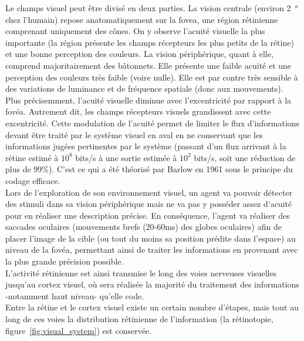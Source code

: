 Le champs visuel peut être divisé en deux parties. La vision centrale (environ \SI{2}{\degree} chez l'humain) repose anatomatiquement sur la fovea, une région rétinienne comprenant uniquement des cônes. On y observe l'acuité visuelle la plus importante (la région présente les champs récepteurs les plus petits de la rétine) et une bonne perception des couleurs.
La vision périphérique, quant à elle, comprend majoritairement des bâtonnets. Elle présente une faible acuité et une perception des couleurs très faible (voire nulle). Elle est par contre très sensible à des variations de luminance et de fréquence spatiale (donc aux mouvements).
 Plus précisemment, l'acuité visuelle diminue avec l'excentricité par rapport à la fovéa. Autrement dit, les champs récepteurs visuels grandissent avec cette excentricité. Cette modulation de l'acuité permet de limiter le flux d'informations devant être traité par le système visuel en aval en ne conservant que les informations jugées pertinentes par le système (passant d'un flux arrivant à la rétine estimé à $10^8$ bits/s à une sortie estimée à $10^2$ bits/s, soit une réduction de plus de 99\%). C'est ce qui a été théorisé par Barlow en 1961 sous le principe du codage efficace. \autocite{Kortum1996, Zhaoping2014, Werner2014, Itti2000}\\
Lors de l'exploration de son environnement visuel, un agent va pouvoir détecter des stimuli dans sa vision périphérique mais ne va pas y posséder assez d'acuité pour en réaliser une description précise.
En conséquence, l'agent va réaliser des saccades oculaires (mouvements brefs (20-60\si{\milli\second}) des globes oculaires) afin de placer l'image de la cible (ou tout du moins sa position prédite dans l'espace) au niveau de la fovéa, permettant ainsi de traiter les informations en provenant avec la plus grande précision possible.\autocite{Kortum1996, Werner2014}\\

L'activité rétinienne est ainsi transmise le long des voies nerveuses visuelles jusqu'au cortex visuel, où sera réalisée la majorité du traitement des informations -notamment haut niveau- qu'elle code.\autocite{Werner2014} \\
Entre la rétine et le cortex visuel existe un certain nombre d'étapes, mais tout au long de ces voies la distribution rétinienne de l'information (la rétinotopie, figure~\ref{fig:visual_system}) est conservée.\autocite{Werner2014}\\

